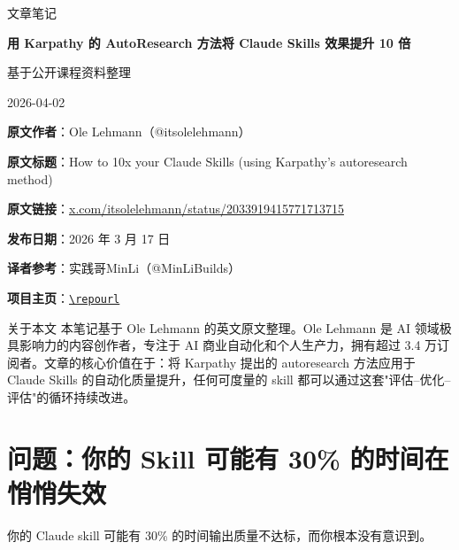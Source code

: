 \documentclass[a4paper]{article}
\newcommand{\notetitle}{用 Karpathy 的 AutoResearch 方法将 Claude Skills 效果提升 10 倍}
\newcommand{\noteauthors}{基于公开课程资料整理}
\newcommand{\notedate}{2026-04-02}
\begin{document}
\begin{titlepage}
\centering
{\Large 文章笔记\par}
\vspace{1.2cm}
{\huge\bfseries \notetitle\par}
\vspace{0.8cm}
{\large \noteauthors\par}
\vspace{0.3cm}
{\large \notedate\par}
\vspace{1.5cm}

\begin{tcolorbox}[width=0.9\textwidth, colback=black!2!white, colframe=black!60, sharp corners]
\textbf{原文作者}：Ole Lehmann（@itsolelehmann）\par
\textbf{原文标题}：How to 10x your Claude Skills (using Karpathy's autoresearch method)\par
\textbf{原文链接}：\href{https://x.com/itsolelehmann/status/2033919415771713715}{x.com/itsolelehmann/status/2033919415771713715}\par
\textbf{发布日期}：2026 年 3 月 17 日\par
\textbf{译者参考}：实践哥MinLi（@MinLiBuilds）\par
\textbf{项目主页}：\href{\repourl}{\nolinkurl{\repourl}}\par
\end{tcolorbox}

\vspace{1cm}
\begin{knowledgebox}{关于本文}
本笔记基于 Ole Lehmann 的英文原文整理。Ole Lehmann 是 AI 领域极具影响力的内容创作者，专注于 AI 商业自动化和个人生产力，拥有超过 3.4 万订阅者。文章的核心价值在于：将 Karpathy 提出的 autoresearch 方法应用于 Claude Skills 的自动化质量提升，任何可度量的 skill 都可以通过这套"评估--优化--评估"的循环持续改进。
\end{knowledgebox}

\end{titlepage}

\tableofcontents
\newpage


\section{问题：你的 Skill 可能有 30\% 的时间在悄悄失效}

你的 Claude skill 可能有 30\% 的时间输出质量不达标，而你根本没有意识到。
\end{document}
